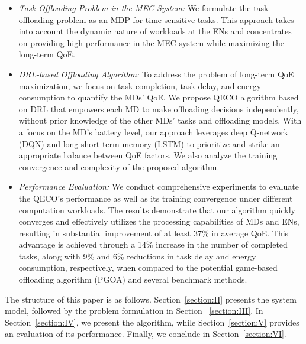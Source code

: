 \documentclass[12pt,draftclsnofoot,onecolumn]{IEEEtran}
\begin{document}
\begin{itemize}
	\item \textit{Task Offloading Problem in the MEC System:} We formulate the task offloading problem as an MDP for time-sensitive tasks. This approach takes into account the dynamic nature of workloads at the ENs and concentrates on providing high performance in the MEC system while maximizing the long-term QoE.
	
	\item \textit{DRL-based Offloading Algorithm:} To address the problem of long-term QoE maximization, we focus on task completion, task delay, and energy consumption to quantify the MDs' QoE. We propose QECO algorithm based on DRL that empowers each MD to make offloading decisions independently, without prior knowledge of the other MDs' tasks and offloading models. With a focus on the MD's battery level, our approach leverages deep Q-network (DQN) \cite{mnih2015human} and long short-term memory (LSTM) \cite{hochreiter1997long} to prioritize and strike an appropriate balance between QoE factors. We also analyze the training convergence and complexity of the proposed algorithm.
	
	\item \textit{Performance Evaluation:} We conduct comprehensive experiments to evaluate the QECO's performance as well as its training convergence under different computation workloads. The results demonstrate that our algorithm quickly converges and effectively utilizes the processing capabilities of MDs and ENs, resulting in substantial improvement of at least 37\% in average QoE. This advantage is achieved through a 14\% increase in the number of completed tasks, along with 9\% and 6\% reductions in task delay and energy consumption, respectively, when compared to the potential game-based offloading algorithm (PGOA) \cite{yang2018distributed} and several benchmark methods.
	
	
	
\end{itemize}

The structure of this paper is as follows. Section~\ref{section:II} presents the system model, followed by the problem formulation in Section ~\ref{section:III}. In Section~\ref{section:IV}, we present the algorithm, while Section~\ref{section:V} provides an evaluation of its performance. Finally, we conclude in Section~\ref{section:VI}.
\end{document}
